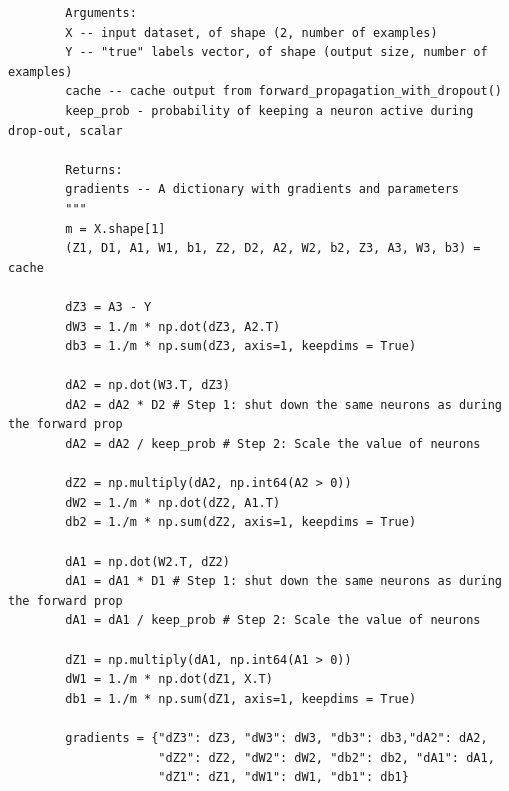\documentclass[11pt, a4paper]{article}
\begin{document}
\begin{spacing}{1.1}
\begin{lstlisting}
		Arguments:
		X -- input dataset, of shape (2, number of examples)
		Y -- "true" labels vector, of shape (output size, number of examples)
		cache -- cache output from forward_propagation_with_dropout()
		keep_prob - probability of keeping a neuron active during drop-out, scalar
		
		Returns:
		gradients -- A dictionary with gradients and parameters
		"""
		m = X.shape[1]
		(Z1, D1, A1, W1, b1, Z2, D2, A2, W2, b2, Z3, A3, W3, b3) = cache
		
		dZ3 = A3 - Y
		dW3 = 1./m * np.dot(dZ3, A2.T)
		db3 = 1./m * np.sum(dZ3, axis=1, keepdims = True)
		
		dA2 = np.dot(W3.T, dZ3)
		dA2 = dA2 * D2 # Step 1: shut down the same neurons as during the forward prop
		dA2 = dA2 / keep_prob # Step 2: Scale the value of neurons

		dZ2 = np.multiply(dA2, np.int64(A2 > 0))
		dW2 = 1./m * np.dot(dZ2, A1.T)
		db2 = 1./m * np.sum(dZ2, axis=1, keepdims = True)
		
		dA1 = np.dot(W2.T, dZ2)
		dA1 = dA1 * D1 # Step 1: shut down the same neurons as during the forward prop
		dA1 = dA1 / keep_prob # Step 2: Scale the value of neurons

		dZ1 = np.multiply(dA1, np.int64(A1 > 0))
		dW1 = 1./m * np.dot(dZ1, X.T)
		db1 = 1./m * np.sum(dZ1, axis=1, keepdims = True)
		
		gradients = {"dZ3": dZ3, "dW3": dW3, "db3": db3,"dA2": dA2,
		             "dZ2": dZ2, "dW2": dW2, "db2": db2, "dA1": dA1, 
		             "dZ1": dZ1, "dW1": dW1, "db1": db1}
		

\end{lstlisting}
\end{spacing}
\end{document}
